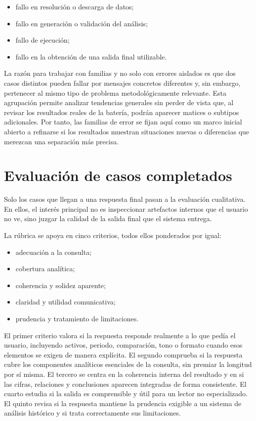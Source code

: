 \begin{itemize}
    \item fallo en resoluci\'on o descarga de datos;
    \item fallo en generaci\'on o validaci\'on del an\'alisis;
    \item fallo de ejecuci\'on;
    \item fallo en la obtenci\'on de una salida final utilizable.
\end{itemize}

La raz\'on para trabajar con familias y no solo con errores aislados es que dos casos distintos pueden fallar por mensajes concretos diferentes y, sin embargo,
pertenecer al mismo tipo de problema metodol\'ogicamente relevante. Esta agrupaci\'on permite analizar tendencias generales sin perder de vista que, al
revisar los resultados reales de la bater\'ia, podr\'an aparecer matices o subtipos adicionales. Por tanto, las familias de error se fijan aqu\'i como un
marco inicial abierto a refinarse si los resultados muestran situaciones nuevas o diferencias que merezcan una separaci\'on m\'as precisa.

\section{Evaluaci\'on de casos completados}

Solo los casos que llegan a una respuesta final pasan a la evaluaci\'on cualitativa. En ellos, el inter\'es principal no es inspeccionar artefactos
internos que el usuario no ve, sino juzgar la calidad de la salida final que el sistema entrega.

La r\'ubrica se apoya en cinco criterios, todos ellos ponderados por igual:

\begin{itemize}
    \item adecuaci\'on a la consulta;
    \item cobertura anal\'itica;
    \item coherencia y solidez aparente;
    \item claridad y utilidad comunicativa;
    \item prudencia y tratamiento de limitaciones.
\end{itemize}

El primer criterio valora si la respuesta responde realmente a lo que ped\'ia el usuario, incluyendo activos, periodo, comparaci\'on, tono o formato cuando
esos elementos se exigen de manera expl\'icita. El segundo comprueba si la respuesta cubre los componentes anal\'iticos esenciales de la consulta, sin
premiar la longitud por s\'i misma. El tercero se centra en la coherencia interna del resultado y en si las cifras, relaciones y conclusiones aparecen
integradas de forma consistente. El cuarto estudia si la salida es comprensible y \'util para un lector no especializado. El quinto revisa si la respuesta
mantiene la prudencia exigible a un sistema de an\'alisis hist\'orico y si trata correctamente sus limitaciones.

